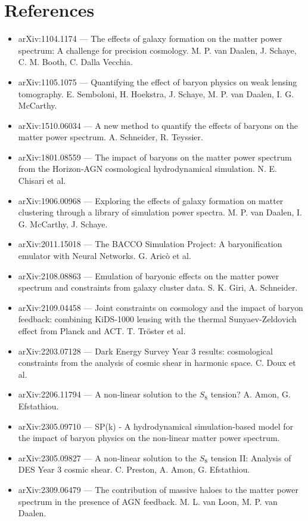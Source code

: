 \documentclass[11pt,a4paper]{article}
\begin{document}
\section*{References}
\begin{itemize}
\item arXiv:1104.1174 --- The effects of galaxy formation on the matter power spectrum: A challenge for precision cosmology. M. P. van Daalen, J. Schaye, C. M. Booth, C. Dalla Vecchia.
\item arXiv:1105.1075 --- Quantifying the effect of baryon physics on weak lensing tomography. E. Semboloni, H. Hoekstra, J. Schaye, M. P. van Daalen, I. G. McCarthy.
\item arXiv:1510.06034 --- A new method to quantify the effects of baryons on the matter power spectrum. A. Schneider, R. Teyssier.
\item arXiv:1801.08559 --- The impact of baryons on the matter power spectrum from the Horizon-AGN cosmological hydrodynamical simulation. N. E. Chisari et al.
\item arXiv:1906.00968 --- Exploring the effects of galaxy formation on matter clustering through a library of simulation power spectra. M. P. van Daalen, I. G. McCarthy, J. Schaye.
\item arXiv:2011.15018 --- The BACCO Simulation Project: A baryonification emulator with Neural Networks. G. Aricò et al.
\item arXiv:2108.08863 --- Emulation of baryonic effects on the matter power spectrum and constraints from galaxy cluster data. S. K. Giri, A. Schneider.
\item arXiv:2109.04458 --- Joint constraints on cosmology and the impact of baryon feedback: combining KiDS-1000 lensing with the thermal Sunyaev-Zeldovich effect from Planck and ACT. T. Tröster et al.
\item arXiv:2203.07128 --- Dark Energy Survey Year 3 results: cosmological constraints from the analysis of cosmic shear in harmonic space. C. Doux et al.
\item arXiv:2206.11794 --- A non-linear solution to the $S_8$ tension? A. Amon, G. Efstathiou.
\item arXiv:2305.09710 --- SP(k) - A hydrodynamical simulation-based model for the impact of baryon physics on the non-linear matter power spectrum.
\item arXiv:2305.09827 --- A non-linear solution to the $S_8$ tension II: Analysis of DES Year 3 cosmic shear. C. Preston, A. Amon, G. Efstathiou.
\item arXiv:2309.06479 --- The contribution of massive haloes to the matter power spectrum in the presence of AGN feedback. M. L. van Loon, M. P. van Daalen.

\end{itemize}
\end{document}
